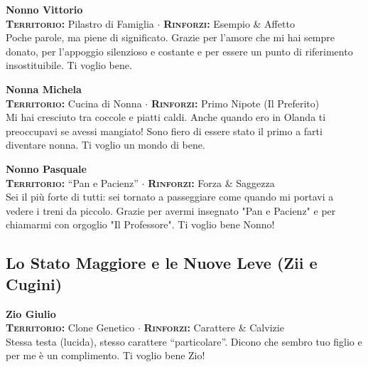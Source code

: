 \noindent\begin{minipage}{\linewidth}
\textbf{Nonno Vittorio} \\
{\footnotesize \textbf{\textsc{Territorio:}} Pilastro di Famiglia $\cdot$ \textbf{\textsc{Rinforzi:}} Esempio \& Affetto} \\
Poche parole, ma piene di significato. Grazie per l'amore che mi hai sempre donato, per l'appoggio silenzioso e costante e per essere un punto di riferimento insostituibile. Ti voglio bene.
\end{minipage}
\vspace{0.6cm}

\noindent\begin{minipage}{\linewidth}
\textbf{Nonna Michela} \\
{\footnotesize \textbf{\textsc{Territorio:}} Cucina di Nonna $\cdot$ \textbf{\textsc{Rinforzi:}} Primo Nipote (Il Preferito)} \\
Mi hai cresciuto tra coccole e piatti caldi. Anche quando ero in Olanda ti preoccupavi se avessi mangiato! Sono fiero di essere stato il primo a farti diventare nonna. Ti voglio un mondo di bene.
\end{minipage}
\vspace{0.6cm}

\noindent\begin{minipage}{\linewidth}
\textbf{Nonno Pasquale} \\
{\footnotesize \textbf{\textsc{Territorio:}} ``Pan e Pacienz'' $\cdot$ \textbf{\textsc{Rinforzi:}} Forza \& Saggezza} \\
Sei il più forte di tutti: sei tornato a passeggiare come quando mi portavi a vedere i treni da piccolo. Grazie per avermi insegnato "Pan e Pacienz" e per chiamarmi con orgoglio "Il Professore". Ti voglio bene Nonno!
\end{minipage}

\subsection*{Lo Stato Maggiore e le Nuove Leve (Zii e Cugini)}

\noindent\begin{minipage}{\linewidth}
\textbf{Zio Giulio} \\
{\footnotesize \textbf{\textsc{Territorio:}} Clone Genetico $\cdot$ \textbf{\textsc{Rinforzi:}} Carattere \& Calvizie} \\
Stessa testa (lucida), stesso carattere ``particolare''. Dicono che sembro tuo figlio e per me è un complimento. Ti voglio bene Zio!
\end{minipage}
\vspace{0.6cm}

